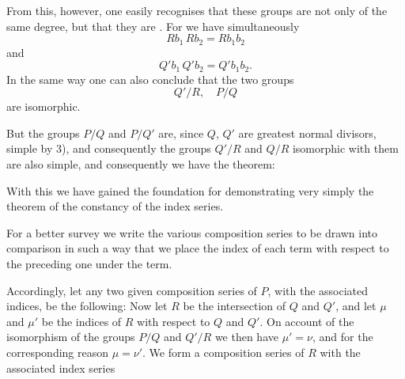 From this, however, one easily recognises that these groups are not
only of the same degree, but that they are . For we have
simultaneously
\[
Rb_1\,Rb_2 = Rb_1b_2
\]
and
\[
Q'b_1\,Q'b_2 = Q'b_1b_2.
\]
In the same way one can also conclude that the two groups
\[
Q'/R,\quad P/Q
\]
are isomorphic.

But the groups $P/Q$ and $P/Q'$ are, since $Q$, $Q'$ are greatest
normal divisors, simple by 3), and consequently the groups $Q'/R$
and $Q/R$ isomorphic with them are also simple, and consequently we
have the theorem:


With this we have gained the foundation for demonstrating very
simply the theorem of the constancy of the index series.

For a better survey we write the various composition series to be
drawn into comparison in such a way that we place the index of each
term with respect to the preceding one under the term.

Accordingly, let any two given composition series of $P$, with the
associated indices, be the following:
Now let $R$ be the intersection of $Q$ and $Q'$, and let $\mu$ and
$\mu'$ be the indices of $R$ with respect to $Q$ and $Q'$. On
account of the isomorphism of the groups $P/Q$ and $Q'/R$ we then
have $\mu' = \nu$, and for the corresponding reason $\mu = \nu'$. We
form a composition series of $R$ with the associated index series

